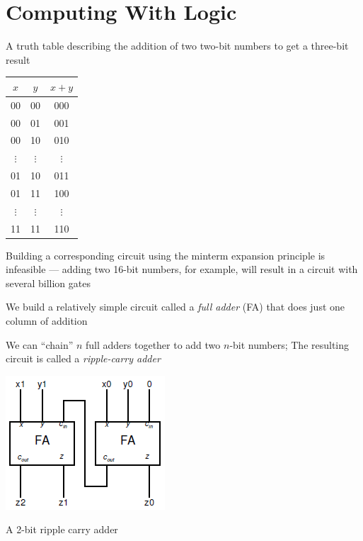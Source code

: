 \documentclass[8pt,a4paper,compress]{beamer}
\begin{document}
\section{Computing With Logic}
\begin{frame}[fragile]
A truth table describing the addition of two two-bit numbers to get a three-bit result
\begin{center}
\begin{tabular}{cc|c}
$x$ & $y$ & $x +y$ \\ \hline
00 & 00 & 000 \\
00 & 01 & 001 \\
00 & 10 & 010 \\
$\vdots$ & $\vdots$ & $\vdots$ \\
01 & 10 & 011 \\
01 & 11 & 100 \\
$\vdots$ & $\vdots$ & $\vdots$ \\
11 & 11 & 110
\end{tabular}
\end{center}

\bigskip

Building a corresponding circuit using the minterm expansion principle is infeasible --- adding two 16-bit numbers, for example, will result in a circuit with several billion gates
\end{frame}

\begin{frame}[fragile]
We build a relatively simple circuit called a \emph{full adder} (FA) that does just one column of addition

\bigskip

We can ``chain'' $n$ full adders together to add two $n$-bit numbers;  The resulting circuit is called a \emph{ripple-carry adder}

\bigskip

\begin{center}
\includegraphics[scale=0.4]{figures/ripple_carry_adder.png}

\smallskip

\tiny A 2-bit ripple carry adder
\end{center}
\end{frame}
\end{document}
